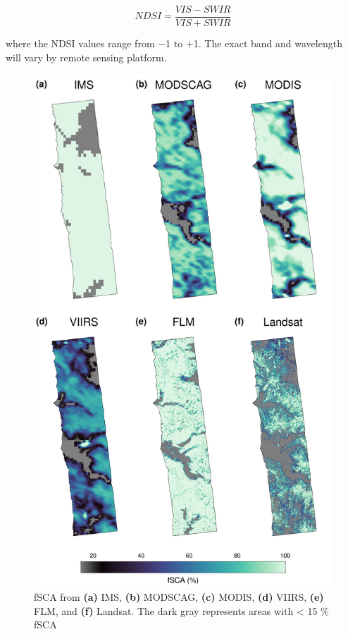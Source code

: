 \begin{equation}
\label{eq:ndsi}
NDSI = \frac{VIS - SWIR}{VIS + SWIR}
\end{equation}

\noindent where the NDSI values range from $-$1 to $+$1. The exact band and wavelength will vary by remote sensing platform. 

\begin{figure}[h]
\includegraphics[width=\textwidth]{figures/ch4_figs/fsca_usvar_v2.pdf}
\caption{fSCA from \textbf{(a)} IMS, \textbf{(b)} MODSCAG, \textbf{(c)} MODIS, \textbf{(d)} VIIRS, \textbf{(e)} FLM, and \textbf{(f)} Landsat. The dark gray represents areas with < 15 \% fSCA}
\label{fig:fsca_plot}
\end{figure}

